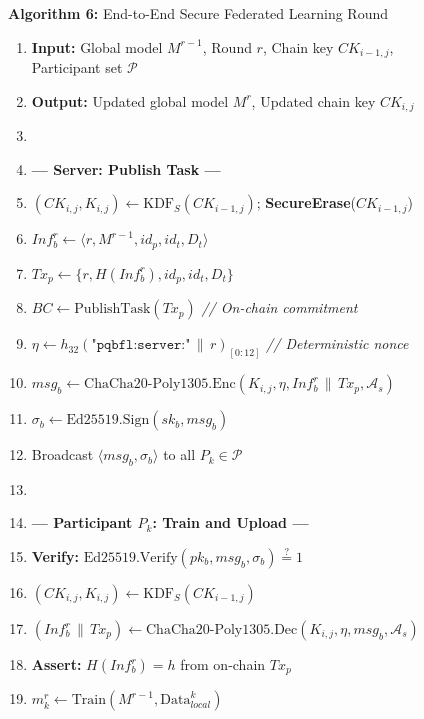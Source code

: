 \documentclass[journal, 10pt, twocolumn]{IEEEtran}
\begin{document}
\begin{figure}[!t]
\hrulefill
\vspace{-0.2cm}
\begin{center}
\textbf{Algorithm 6:} End-to-End Secure Federated Learning Round
\end{center}
\vspace{-0.2cm}
\hrulefill
\begin{enumerate}
    \item \textbf{Input:} Global model $M^{r-1}$, Round $r$, Chain key $CK_{i-1,j}$, Participant set $\mathcal{P}$
    \item \textbf{Output:} Updated global model $M^r$, Updated chain key $CK_{i,j}$
    \item[]
    \item[] \textbf{--- Server: Publish Task ---}
    \item $(CK_{i,j}, K_{i,j}) \leftarrow \text{KDF}_S(CK_{i-1,j})$; \quad \textbf{SecureErase}($CK_{i-1,j}$)
    \item $Inf_b^r \leftarrow \langle r, M^{r-1}, id_p, id_t, D_t \rangle$
    \item $Tx_p \leftarrow \{r, H(Inf_b^r), id_p, id_t, D_t\}$
    \item $BC \leftarrow \text{PublishTask}(Tx_p)$ \quad \textit{// On-chain commitment}
    \item $\eta \leftarrow h_{32}(\texttt{"pqbfl:server:"} \,\|\, r)_{[0:12]}$ \quad \textit{// Deterministic nonce}
    \item $msg_b \leftarrow \text{ChaCha20-Poly1305.Enc}(K_{i,j}, \eta, Inf_b^r \,\|\, Tx_p, \mathcal{A}_s)$
    \item $\sigma_b \leftarrow \text{Ed25519.Sign}(sk_b, msg_b)$
    \item Broadcast $\langle msg_b, \sigma_b \rangle$ to all $P_k \in \mathcal{P}$
    \item[]
    \item[] \textbf{--- Participant $P_k$: Train and Upload ---}
    \item \textbf{Verify:} $\text{Ed25519.Verify}(pk_b, msg_b, \sigma_b) \stackrel{?}{=} 1$
    \item $(CK_{i,j}, K_{i,j}) \leftarrow \text{KDF}_S(CK_{i-1,j})$
    \item $(Inf_b^r \,\|\, Tx_p) \leftarrow \text{ChaCha20-Poly1305.Dec}(K_{i,j}, \eta, msg_b, \mathcal{A}_s)$
    \item \textbf{Assert:} $H(Inf_b^r) = h$ from on-chain $Tx_p$
    \item $m_k^r \leftarrow \text{Train}(M^{r-1}, \text{Data}_{local}^k)$

\end{enumerate}
\end{figure}
\end{document}
